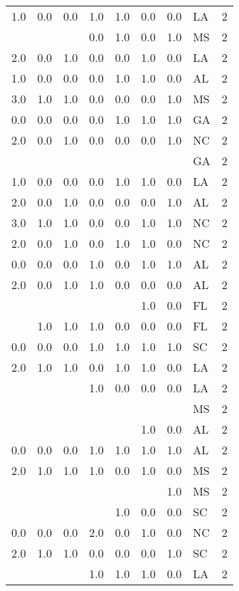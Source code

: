 \begin{tabular}{llllllllr}
1.0 & 0.0 & 0.0 & 1.0 & 1.0 & 0.0 & 0.0 & LA &     2 \\
    &     &     & 0.0 & 1.0 & 0.0 & 1.0 & MS &     2 \\
2.0 & 0.0 & 1.0 & 0.0 & 0.0 & 1.0 & 0.0 & LA &     2 \\
1.0 & 0.0 & 0.0 & 0.0 & 1.0 & 1.0 & 0.0 & AL &     2 \\
3.0 & 1.0 & 1.0 & 0.0 & 0.0 & 0.0 & 1.0 & MS &     2 \\
0.0 & 0.0 & 0.0 & 0.0 & 1.0 & 1.0 & 1.0 & GA &     2 \\
2.0 & 0.0 & 1.0 & 0.0 & 0.0 & 0.0 & 1.0 & NC &     2 \\
    &     &     &     &     &     &     & GA &     2 \\
1.0 & 0.0 & 0.0 & 0.0 & 1.0 & 1.0 & 0.0 & LA &     2 \\
2.0 & 0.0 & 1.0 & 0.0 & 0.0 & 0.0 & 1.0 & AL &     2 \\
3.0 & 1.0 & 1.0 & 0.0 & 0.0 & 1.0 & 1.0 & NC &     2 \\
2.0 & 0.0 & 1.0 & 0.0 & 1.0 & 1.0 & 0.0 & NC &     2 \\
0.0 & 0.0 & 0.0 & 1.0 & 0.0 & 1.0 & 1.0 & AL &     2 \\
2.0 & 0.0 & 1.0 & 1.0 & 0.0 & 0.0 & 0.0 & AL &     2 \\
    &     &     &     &     & 1.0 & 0.0 & FL &     2 \\
    & 1.0 & 1.0 & 1.0 & 0.0 & 0.0 & 0.0 & FL &     2 \\
0.0 & 0.0 & 0.0 & 1.0 & 1.0 & 1.0 & 1.0 & SC &     2 \\
2.0 & 1.0 & 1.0 & 0.0 & 1.0 & 1.0 & 0.0 & LA &     2 \\
    &     &     & 1.0 & 0.0 & 0.0 & 0.0 & LA &     2 \\
    &     &     &     &     &     &     & MS &     2 \\
    &     &     &     &     & 1.0 & 0.0 & AL &     2 \\
0.0 & 0.0 & 0.0 & 1.0 & 1.0 & 1.0 & 1.0 & AL &     2 \\
2.0 & 1.0 & 1.0 & 1.0 & 0.0 & 1.0 & 0.0 & MS &     2 \\
    &     &     &     &     &     & 1.0 & MS &     2 \\
    &     &     &     & 1.0 & 0.0 & 0.0 & SC &     2 \\
0.0 & 0.0 & 0.0 & 2.0 & 0.0 & 1.0 & 0.0 & NC &     2 \\
2.0 & 1.0 & 1.0 & 0.0 & 0.0 & 0.0 & 1.0 & SC &     2 \\
    &     &     & 1.0 & 1.0 & 1.0 & 0.0 & LA &     2 \\

\end{tabular}
